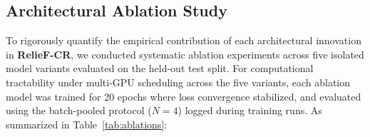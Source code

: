 \subsection{Architectural Ablation Study}
To rigorously quantify the empirical contribution of each architectural innovation in \textbf{RelieF-CR}, we conducted systematic ablation experiments across five isolated model variants evaluated on the held-out test split. For computational tractability under multi-GPU scheduling across the five variants, each ablation model was trained for 20 epochs where loss convergence stabilized, and evaluated using the batch-pooled protocol ($N=4$) logged during training runs. As summarized in Table~\ref{tab:ablations}:

\begin{table}[!t]
\centering
\caption{Ablation Study of Proposed Architectural Modules Across Held-Out Test Patches.}
\label{tab:ablations}
\end{table}

